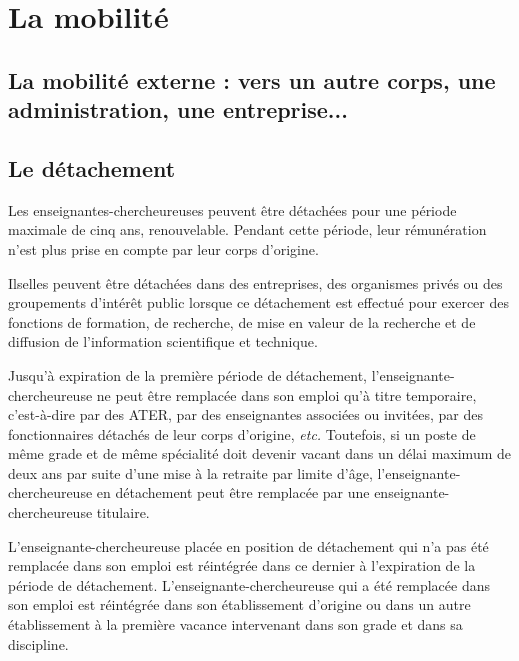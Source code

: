 \section{La mobilit\'e}

\subsection{La mobilit\'e externe : vers un autre corps, une administration, une entreprise...}

\subsection*{Le d\'etachement}

Les enseignant\mp e\mp s-chercheur\mp euse\mp s peuvent \^etre d\'etach\'e\mp e\mp s pour une
p\'eriode maximale de cinq ans, renouvelable. Pendant cette p\'eriode, leur r\'emun\'eration n'est plus prise en compte par
leur corps d'origine.

Ils\mp elles peuvent \^etre d\'etach\'e\mp e\mp s dans des entreprises, des organismes
priv\'es ou des groupements d'int\'er\^et public lorsque ce
d\'etachement est effectu\'e pour exercer des fonctions de
formation, de recherche, de mise en valeur de la recherche et de
diffusion de l'information scientifique et technique.

Jusqu'\`a expiration de la premi\`ere p\'eriode de d\'etachement,
l'enseignant\mp e-chercheur\mp euse ne peut \^etre remplac\'e\mp e dans son emploi
qu'\`a titre temporaire, c'est-\`a-dire par des ATER, par des
enseignant\mp e\mp s associ\'e\mp e\mp s ou invit\'e\mp e\mp s, par des fonctionnaires
d\'etach\'es de leur corps d'origine, {\em etc.} Toutefois, si un
poste de m\^eme grade et de m\^eme sp\'ecialit\'e doit devenir
vacant dans un d\'elai maximum de deux ans par suite d'une mise \`a
la retraite par limite d'\^age, l'enseignant\mp e-chercheur\mp euse en
d\'etachement peut \^etre remplac\'e\mp e par un\mp e enseignant\mp e-chercheur\mp euse
titulaire.

L'enseignant\mp e-chercheur\mp euse plac\'e\mp e en position de d\'etachement qui n'a pas
\'et\'e remplac\'e\mp e dans son emploi est r\'eint\'egr\'e\mp e dans ce dernier
\`a l'expiration de la p\'eriode de d\'etachement.
L'enseignant\mp e-chercheur\mp euse qui a \'et\'e remplac\'e\mp e dans son emploi est
r\'eint\'egr\'e\mp e dans son \'etablissement d'origine ou dans un autre
\'etablissement \`a la premi\`ere vacance intervenant dans son grade et
dans sa discipline.

